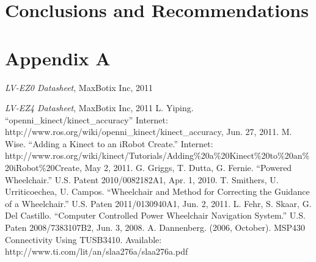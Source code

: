 \documentclass[oneside,final]{report}
\begin{document}
\chapter{Conclusions and Recommendations}

\chapter*{Appendix A}

\begin{thebibliography}{9}


   \emph{LV-EZ0 Datasheet}, MaxBotix Inc, 2011
 
   \emph{LV-EZ4 Datasheet}, MaxBotix Inc, 2011
L. Yiping. “openni\_kinect/kinect\_accuracy” Internet: http://www.ros.org/wiki/openni\_kinect/kinect\_accuracy, Jun. 27, 2011.
	M. Wise. “Adding a Kinect to an iRobot Create.” Internet: http://www.ros.org/wiki/kinect/Tutorials/Adding\%20a\%20Kinect\%20to\%20an\%20iRobot\%20Create, May 2, 2011.
	G. Griggs, T. Dutta, G. Fernie. “Powered Wheelchair.” U.S. Patent 2010/0082182A1, Apr. 1, 2010.
	T. Smithers, U. Urriticoechea, U. Campos. “Wheelchair and Method for Correcting the Guidance of a Wheelchair.” U.S. Paten 2011/0130940A1, Jun. 2, 2011.
	L. Fehr, S. Skaar, G. Del Castillo. “Computer Controlled Power Wheelchair Navigation System.” U.S. Paten 2008/7383107B2, Jun. 3, 2008.
	A. Dannenberg. (2006, October). MSP430 Connectivity Using TUSB3410. Available: http://www.ti.com/lit/an/slaa276a/slaa276a.pdf
\end{thebibliography}
\end{document}
